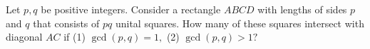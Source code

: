 Let $p,q$ be positive integers. Consider a rectangle $ABCD$ with lengths of sides $p$ and $q$ that consists of $pq$ unital squares. How many of these squares intersect with diagonal $AC$ if
(1) $\gcd(p,q)=1,$
(2) $\gcd(p,q)>1?$